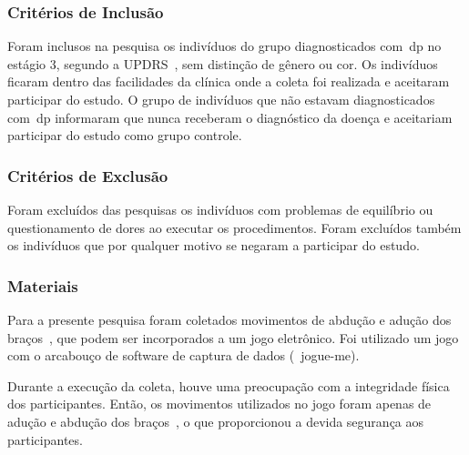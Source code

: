 \subsubsection{Critérios de Inclusão}
Foram inclusos na pesquisa os indivíduos do grupo diagnosticados com~\ac{dp} no estágio 3, segundo a UPDRS~\cite{updrs87}, sem distinção de gênero ou cor. Os indivíduos ficaram dentro das facilidades da clínica onde a coleta foi realizada e aceitaram participar do estudo. O grupo de indivíduos que não estavam diagnosticados com~\ac{dp} informaram que nunca receberam o diagnóstico da doença e aceitariam participar do estudo como grupo controle.

\subsubsection{Critérios de Exclusão}
Foram excluídos das pesquisas os indivíduos com problemas de equilíbrio ou questionamento de dores ao executar os procedimentos. Foram excluídos também os indivíduos que por qualquer motivo se negaram a participar do estudo.

\subsubsection{Materiais}
Para a presente pesquisa foram coletados movimentos de abdução e adução dos braços~\cite{mcginnis2013biomechanics}, que podem ser incorporados a um jogo eletrônico. Foi utilizado um jogo com o arcabouço de software de captura de dados (~\ac{jogue-me}). 

Durante a execução da coleta, houve uma preocupação com a integridade física dos participantes. Então, os movimentos utilizados no jogo foram apenas de adução e abdução dos braços~\cite{mcginnis2013biomechanics}, o que proporcionou a devida segurança aos participantes. 

% 

